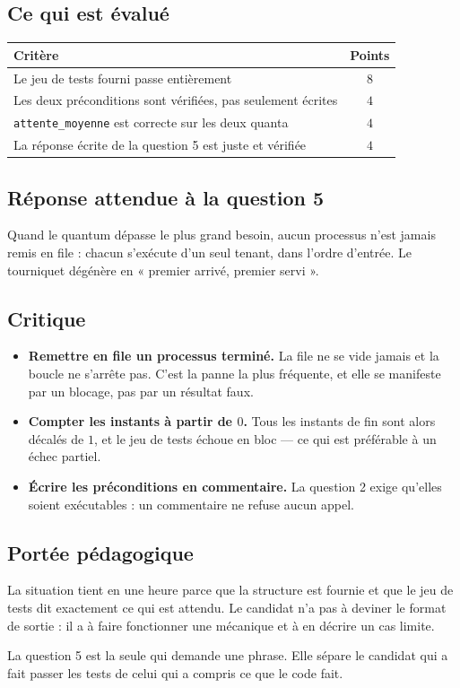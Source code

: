\subsection*{Ce qui est évalué}

\begin{center}
\begin{tabular}{|l|c|}
\hline
\textbf{Critère} & \textbf{Points} \\
\hline
Le jeu de tests fourni passe entièrement & $8$ \\
\hline
Les deux préconditions sont vérifiées, pas seulement écrites & $4$ \\
\hline
\texttt{attente\_moyenne} est correcte sur les deux quanta & $4$ \\
\hline
La réponse écrite de la question 5 est juste et vérifiée & $4$ \\
\hline
\end{tabular}
\end{center}

\subsection*{Réponse attendue à la question 5}

Quand le quantum dépasse le plus grand besoin, aucun processus n'est jamais
remis en file : chacun s'exécute d'un seul tenant, dans l'ordre d'entrée. Le
tourniquet dégénère en « premier arrivé, premier servi ».

\subsection*{Critique}

\begin{itemize}
  \item \textbf{Remettre en file un processus terminé.} La file ne se vide
    jamais et la boucle ne s'arrête pas. C'est la panne la plus fréquente, et
    elle se manifeste par un blocage, pas par un résultat faux.
  \item \textbf{Compter les instants à partir de $0$.} Tous les instants de fin
    sont alors décalés de $1$, et le jeu de tests échoue en bloc — ce qui est
    préférable à un échec partiel.
  \item \textbf{Écrire les préconditions en commentaire.} La question 2 exige
    qu'elles soient exécutables : un commentaire ne refuse aucun appel.
\end{itemize}

\subsection*{Portée pédagogique}

La situation tient en une heure parce que la structure est fournie et que le
jeu de tests dit exactement ce qui est attendu. Le candidat n'a pas à deviner
le format de sortie : il a à faire fonctionner une mécanique et à en décrire un
cas limite.

La question 5 est la seule qui demande une phrase. Elle sépare le candidat qui
a fait passer les tests de celui qui a compris ce que le code fait.
